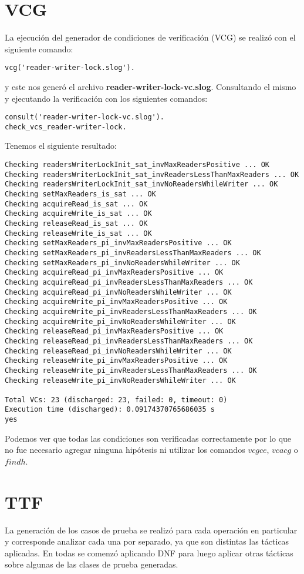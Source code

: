 \documentclass[a4paper, 12pt]{article}
\begin{document}
\section{VCG}
La ejecución del generador de condiciones de verificación (VCG) se realizó con el siguiente comando:
\begin{verbatim}
vcg('reader-writer-lock.slog').
\end{verbatim}
y este nos generó el archivo \textbf{reader-writer-lock-vc.slog}. Consultando el mismo y ejecutando la verificación con los siguientes comandos:
\begin{verbatim}
consult('reader-writer-lock-vc.slog').
check_vcs_reader-writer-lock.
\end{verbatim}
Tenemos el siguiente resultado:
\begin{verbatim}
Checking readersWriterLockInit_sat_invMaxReadersPositive ... OK
Checking readersWriterLockInit_sat_invReadersLessThanMaxReaders ... OK
Checking readersWriterLockInit_sat_invNoReadersWhileWriter ... OK
Checking setMaxReaders_is_sat ... OK
Checking acquireRead_is_sat ... OK
Checking acquireWrite_is_sat ... OK
Checking releaseRead_is_sat ... OK
Checking releaseWrite_is_sat ... OK
Checking setMaxReaders_pi_invMaxReadersPositive ... OK
Checking setMaxReaders_pi_invReadersLessThanMaxReaders ... OK
Checking setMaxReaders_pi_invNoReadersWhileWriter ... OK
Checking acquireRead_pi_invMaxReadersPositive ... OK
Checking acquireRead_pi_invReadersLessThanMaxReaders ... OK
Checking acquireRead_pi_invNoReadersWhileWriter ... OK
Checking acquireWrite_pi_invMaxReadersPositive ... OK
Checking acquireWrite_pi_invReadersLessThanMaxReaders ... OK
Checking acquireWrite_pi_invNoReadersWhileWriter ... OK
Checking releaseRead_pi_invMaxReadersPositive ... OK
Checking releaseRead_pi_invReadersLessThanMaxReaders ... OK
Checking releaseRead_pi_invNoReadersWhileWriter ... OK
Checking releaseWrite_pi_invMaxReadersPositive ... OK
Checking releaseWrite_pi_invReadersLessThanMaxReaders ... OK
Checking releaseWrite_pi_invNoReadersWhileWriter ... OK

Total VCs: 23 (discharged: 23, failed: 0, timeout: 0)
Execution time (discharged): 0.09174370765686035 s
yes
\end{verbatim}

Podemos ver que todas las condiciones son verificadas correctamente por lo que no fue necesario agregar ninguna hipótesis ni utilizar los comandos $vcgce$, $vcacg$ o $findh$.

\section{TTF}
La generación de los casos de prueba se realizó para cada operación en particular y corresponde analizar cada una por separado, ya que son distintas las tácticas aplicadas. En todas se comenzó aplicando DNF para luego aplicar otras tácticas sobre algunas de las clases de prueba generadas.
\end{document}

